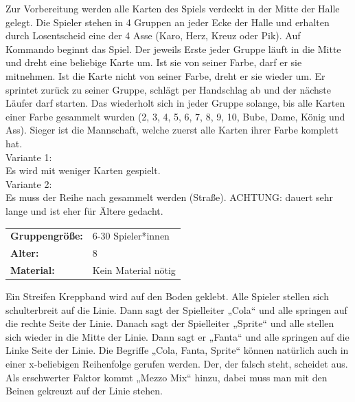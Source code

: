 Zur Vorbereitung werden alle Karten des Spiels verdeckt in der Mitte der Halle gelegt. Die Spieler stehen in 4 Gruppen an jeder Ecke der Halle und erhalten durch Losentscheid eine der 4 Asse (Karo, Herz, Kreuz oder Pik).
Auf Kommando beginnt das Spiel. Der jeweils Erste jeder Gruppe läuft in die Mitte und dreht eine beliebige Karte um. Ist sie von seiner Farbe, darf er sie mitnehmen. Ist die Karte nicht von seiner Farbe, dreht er sie wieder um. Er sprintet zurück zu seiner Gruppe, schlägt per Handschlag ab und der nächste Läufer darf starten. Das wiederholt sich in jeder Gruppe solange, bis alle Karten einer Farbe gesammelt wurden (2, 3, 4, 5, 6, 7, 8, 9, 10, Bube, Dame, König und Ass). Sieger ist die Mannschaft, welche zuerst alle Karten ihrer Farbe komplett hat.
 \\ \newline
 Variante 1: \\ Es wird mit weniger Karten gespielt.\\
 Variante 2: \\ Es muss der Reihe nach gesammelt werden (Straße). ACHTUNG: dauert sehr lange und ist eher für Ältere gedacht.\\
 




\begin{table}[H]
\begin{tabular}{>{\bfseries}lp{8cm}}
  Gruppengröße:   & 6-30 Spieler*innen\\
    Alter: & 8 \\
    Material: & Kein Material nötig \\ 
\end{tabular}
\end{table} 
 Ein Streifen Kreppband wird auf den Boden geklebt. Alle Spieler stellen sich schulterbreit auf die Linie. Dann sagt der Spielleiter „Cola“ und alle springen auf die rechte Seite der Linie. Danach sagt der Spielleiter „Sprite“ und alle stellen sich wieder in die Mitte der Linie. Dann sagt er „Fanta“ und alle springen auf die Linke Seite der Linie. Die Begriffe „Cola, Fanta, Sprite“ können natürlich auch in einer x-beliebigen Reihenfolge gerufen werden. Der, der falsch steht, scheidet aus. Als erschwerter Faktor kommt „Mezzo Mix“ hinzu, dabei muss man mit den Beinen gekreuzt auf der Linie stehen. \\




